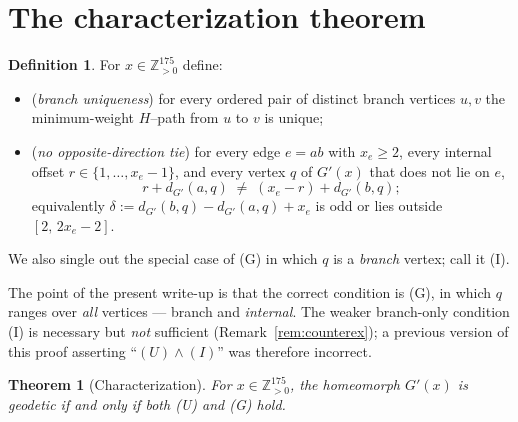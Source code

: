 \documentclass{amsart}
\newtheorem{theorem}{Theorem}
\theoremstyle{definition}
\newtheorem{definition}{Definition}
\begin{document}
\section{The characterization theorem}

\begin{definition}\label{def:conditions}
For $x\in\mathbb Z_{>0}^{175}$ define:
\begin{itemize}
\item[\textnormal{(U)}] (\emph{branch uniqueness}) for every ordered pair of
distinct branch vertices $u,v$ the minimum-weight $H$--path from $u$ to $v$ is
unique;
\item[\textnormal{(G)}] (\emph{no opposite-direction tie}) for every edge
$e=ab$ with $x_e\ge2$, every internal offset $r\in\{1,\dots,x_e-1\}$, and every
vertex $q$ of $G'(x)$ that does not lie on $e$,
\[
 r+d_{G'}(a,q)\;\neq\;(x_e-r)+d_{G'}(b,q);
\]
equivalently $\delta:=d_{G'}(b,q)-d_{G'}(a,q)+x_e$ is odd or lies outside
$[2,\,2x_e-2]$.
\end{itemize}
We also single out the special case of \textnormal{(G)} in which $q$ is a
\emph{branch} vertex; call it \textnormal{(I)}.
\end{definition}

The point of the present write-up is that the correct condition is
\textnormal{(G)}, in which $q$ ranges over \emph{all} vertices --- branch and
\emph{internal}. The weaker branch-only condition \textnormal{(I)} is necessary
but \emph{not} sufficient (Remark~\ref{rem:counterex}); a previous version of
this proof asserting ``$(U)\wedge(I)$'' was therefore incorrect.

\begin{theorem}[Characterization]\label{thm:main}
For $x\in\mathbb Z_{>0}^{175}$, the homeomorph $G'(x)$ is geodetic if and only if
both \textnormal{(U)} and \textnormal{(G)} hold.
\end{theorem}
\end{document}
